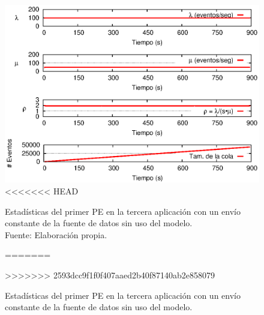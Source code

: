 \begin{figure}[!htp]
    \centering
    \captionsetup{justification=centering}
    \includegraphics[scale=1]{images/exp/app3/sm/logical/statusOnePE.eps}
<<<<<<< HEAD
    \caption[Estadísticas del primer PE en la tercera aplicación con un envío constante de la fuente de datos sin uso del modelo.]{Estadísticas del primer PE en la tercera aplicación con un envío constante de la fuente de datos sin uso del modelo.\\Fuente: Elaboración propia.}
=======
    \caption{Estad\'isticas del primer PE en la tercera aplicaci\'on con un env\'io constante de la fuente de datos sin uso del modelo.}
>>>>>>> 2593dcc9f1f0f407aaed2b40f87140ab2e858079
    \label{fig:app3-statusOnePE-sm}
\end{figure}

